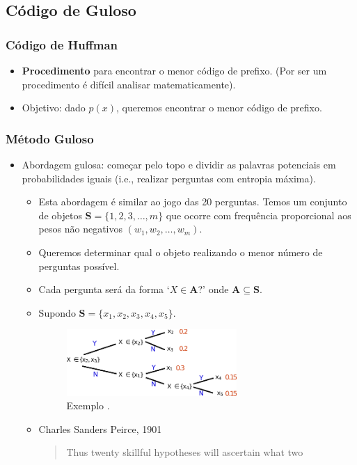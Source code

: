 \subsection{Código de Guloso}
\begin{frame}[allowframebreaks]
  \frametitle{Código de Huffman}
  \begin{itemize}
  \item \textbf{Procedimento} para encontrar o menor código de prefixo. (Por ser um procedimento
	é difícil analisar matematicamente).
  \item Objetivo: dado $p(x)$, queremos encontrar o menor código de prefixo.
  \end{itemize}
\end{frame}

\begin{frame}[allowframebreaks]
  \frametitle{Método Guloso}
  \begin{itemize}
  \item Abordagem gulosa: começar pelo topo e dividir as palavras potenciais em probabilidades iguais
	(i.e., realizar perguntas com entropia máxima).
	\begin{itemize}
	\item Esta abordagem é similar ao jogo das 20 perguntas. Temos um conjunto de objetos
		$\mathbf{S} = \{1, 2, 3, \ldots, m\}$ que ocorre com frequência proporcional aos
		pesos não negativos $(w_1, w_2, \ldots, w_m)$.
	\item Queremos determinar qual o objeto realizando o menor número de perguntas possível.
	\item Cada pergunta será da forma `$X \in \mathbf{A}$?' onde $\mathbf{A} \subseteq \mathbf{S}$.
	\item Supondo $\mathbf{S} = \{x_1, x_2, x_3, x_4, x_5 \}$.
		\begin{figure}[h!]
		\centering
		\includegraphics[width=0.65\textwidth]{images/synq.pdf}
		\caption{Exemplo \citep{bilmes2013}.}
		\label{fig:synq}
		\end{figure}
	\item Charles Sanders Peirce, 1901
		\begin{quote}
		Thus twenty skillful hypotheses will ascertain what two

\end{quote}
\end{itemize}
\end{itemize}
\end{frame}
